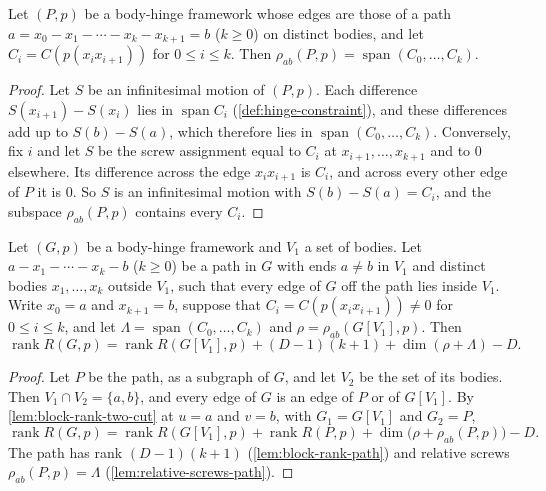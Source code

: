 \begin{lemma}
  \label{lem:relative-screws-path}
  \leanok
  Let $(P,p)$ be a body-hinge framework whose edges are those of a path
  $a = x_0 - x_1 - \cdots - x_k - x_{k+1} = b$ ($k \geq 0$) on distinct
  bodies, and let $C_i = C(p(x_i x_{i+1}))$ for $0 \le i \le k$. Then
  $\rho_{ab}(P,p) = \operatorname{span}(C_0, \dots, C_k)$.
\end{lemma}
\begin{proof}
  \leanok
  Let $S$ be an infinitesimal motion of $(P,p)$. Each difference
  $S(x_{i+1}) - S(x_i)$ lies in $\operatorname{span} C_i$
  (\cref{def:hinge-constraint}), and these differences add up to
  $S(b) - S(a)$, which therefore lies in
  $\operatorname{span}(C_0, \dots, C_k)$. Conversely, fix $i$ and let $S$
  be the screw assignment equal to $C_i$ at $x_{i+1}, \dots, x_{k+1}$ and
  to $0$ elsewhere. Its difference across the edge $x_i x_{i+1}$ is
  $C_i$, and across every other edge of $P$ it is $0$. So $S$ is an
  infinitesimal motion with $S(b) - S(a) = C_i$, and the subspace
  $\rho_{ab}(P,p)$ contains every $C_i$.
\end{proof}

\begin{lemma}
  \label{lem:block-rank-ear}
  \leanok
  Let $(G,p)$ be a body-hinge framework and $V_1$ a set of bodies. Let
  $a - x_1 - \cdots - x_k - b$ ($k \geq 0$) be a path in $G$ with ends
  $a \neq b$ in $V_1$ and distinct bodies $x_1, \dots, x_k$ outside
  $V_1$, such that every edge of $G$ off the path lies inside $V_1$.
  Write $x_0 = a$ and $x_{k+1} = b$, suppose that
  $C_i = C(p(x_i x_{i+1})) \neq 0$ for $0 \le i \le k$, and let
  $\Lambda = \operatorname{span}(C_0, \dots, C_k)$ and
  $\rho = \rho_{ab}(G[V_1], p)$. Then
  \[
    \operatorname{rank} R(G,p) = \operatorname{rank} R(G[V_1],p)
    + (D - 1)(k + 1) + \dim(\rho + \Lambda) - D.
  \]
\end{lemma}
\begin{proof}
  \leanok
  Let $P$ be the path, as a subgraph of $G$, and let $V_2$ be the set of
  its bodies. Then $V_1 \cap V_2 = \{a, b\}$, and every edge of $G$ is an
  edge of $P$ or of $G[V_1]$. By \cref{lem:block-rank-two-cut} at
  $u = a$ and $v = b$, with $G_1 = G[V_1]$ and $G_2 = P$,
  \[
    \operatorname{rank} R(G,p) = \operatorname{rank} R(G[V_1],p)
    + \operatorname{rank} R(P,p) + \dim\bigl(\rho + \rho_{ab}(P,p)\bigr) - D.
  \]
  The path has rank $(D-1)(k+1)$ (\cref{lem:block-rank-path}) and
  relative screws $\rho_{ab}(P,p) = \Lambda$
  (\cref{lem:relative-screws-path}).
\end{proof}

